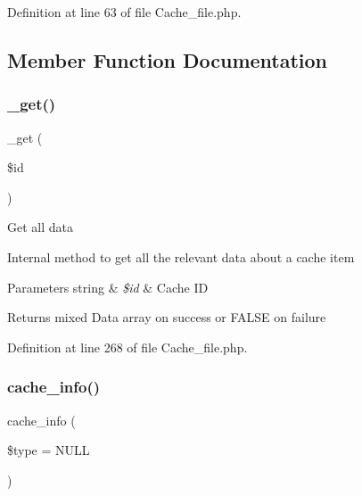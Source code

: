 Definition at line 63 of file Cache\+\_\+file.\+php.



\subsection{Member Function Documentation}
\mbox{\label{class_c_i___cache__file_aae09ed79c1d2dc8b2093602181ddf911}} 
\subsubsection{\texorpdfstring{\_get()}{\_get()}}
{\footnotesize\ttfamily \+\_\+get (\begin{DoxyParamCaption}\item[{}]{\$id }\end{DoxyParamCaption})\hspace{0.3cm}{\ttfamily [protected]}}

Get all data

Internal method to get all the relevant data about a cache item


\begin{DoxyParams}[1]{Parameters}
string & {\em \$id} & Cache ID \\
\hline
\end{DoxyParams}
\begin{DoxyReturn}{Returns}
mixed Data array on success or F\+A\+L\+SE on failure 
\end{DoxyReturn}


Definition at line 268 of file Cache\+\_\+file.\+php.

\mbox{\label{class_c_i___cache__file_aa8b9c4d9f0387156736ccd8850f0727e}} 
\subsubsection{\texorpdfstring{cache\_info()}{cache\_info()}}
{\footnotesize\ttfamily cache\+\_\+info (\begin{DoxyParamCaption}\item[{}]{\$type = {\ttfamily NULL} }\end{DoxyParamCaption})}

